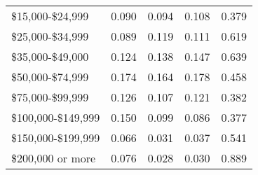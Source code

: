 {\begin{tabular}{L{5.5cm} C{3.5cm} C{3.5cm} C{3.5cm} C{4cm}}
                    \$15,000-\$24,999                     &                          0.090                           &                          0.094                           &                          0.108                           &                          0.379                            \\
                    \$25,000-\$34,999                     &                          0.089                           &                          0.119                           &                          0.111                           &                          0.619                            \\
                    \$35,000-\$49,000                     &                          0.124                           &                          0.138                           &                          0.147                           &                          0.639                            \\
                    \$50,000-\$74,999                     &                          0.174                           &                          0.164                           &                          0.178                           &                          0.458                            \\
                    \$75,000-\$99,999                     &                          0.126                           &                          0.107                           &                          0.121                           &                          0.382                            \\
                   \$100,000-\$149,999                    &                          0.150                           &                          0.099                           &                          0.086                           &                          0.377                            \\
                   \$150,000-\$199,999                    &                          0.066                           &                          0.031                           &                          0.037                           &                          0.541                            \\
                    \$200,000 or more                     &                          0.076                           &                          0.028                           &                          0.030                           &                          0.889                            \\

\end{tabular}}

